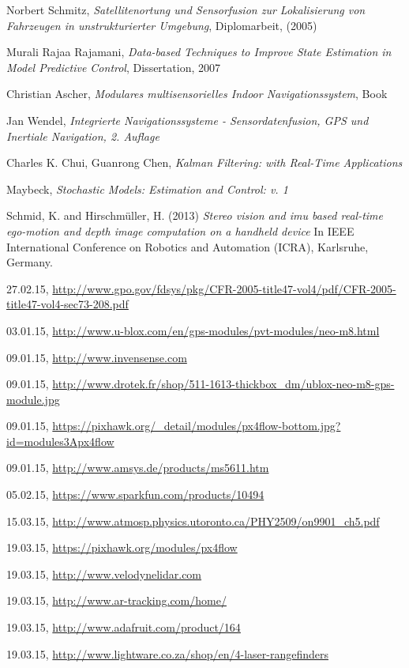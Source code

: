 \begin{thebibliography}{99}


 Norbert Schmitz, \emph{Satellitenortung und Sensorfusion zur Lokalisierung von Fahrzeugen in unstrukturierter Umgebung}, Diplomarbeit, (2005)

 Murali Rajaa Rajamani, \emph{Data-based Techniques to Improve State Estimation in Model Predictive Control}, Dissertation, 2007

 Christian Ascher, \emph{Modulares multisensorielles Indoor Navigationssystem}, Book

 Jan Wendel, \emph{Integrierte Navigationssysteme - Sensordatenfusion, GPS und Inertiale Navigation, 2. Auflage}

 Charles K. Chui, Guanrong Chen, \emph{Kalman Filtering: with Real-Time Applications}

 Maybeck, \emph{Stochastic Models: Estimation and Control: v. 1}

 Schmid, K. and Hirschmüller, H. (2013) \emph{Stereo vision and imu based real-time ego-motion and depth image computation on a handheld device} In IEEE International Conference on Robotics and Automation (ICRA), Karlsruhe, Germany.

 27.02.15, \url{http://www.gpo.gov/fdsys/pkg/CFR-2005-title47-vol4/pdf/CFR-2005-title47-vol4-sec73-208.pdf}

 03.01.15, \url{http://www.u-blox.com/en/gps-modules/pvt-modules/neo-m8.html}

 09.01.15, \url{http://www.invensense.com}

 09.01.15, \url{http://www.drotek.fr/shop/511-1613-thickbox_dm/ublox-neo-m8-gps-module.jpg}

 	09.01.15, \url{https://pixhawk.org/_detail/modules/px4flow-bottom.jpg?id=modules3Apx4flow}

 	09.01.15, \url{http://www.amsys.de/products/ms5611.htm}

 	05.02.15, \url{https://www.sparkfun.com/products/10494}

 15.03.15, \url{http://www.atmosp.physics.utoronto.ca/PHY2509/on9901_ch5.pdf}

 19.03.15, \url{https://pixhawk.org/modules/px4flow}

 19.03.15, \url{http://www.velodynelidar.com}

 19.03.15, \url{http://www.ar-tracking.com/home/}

 19.03.15, \url{http://www.adafruit.com/product/164}

 19.03.15, \url{http://www.lightware.co.za/shop/en/4-laser-rangefinders}
\end{thebibliography}



\newpage





